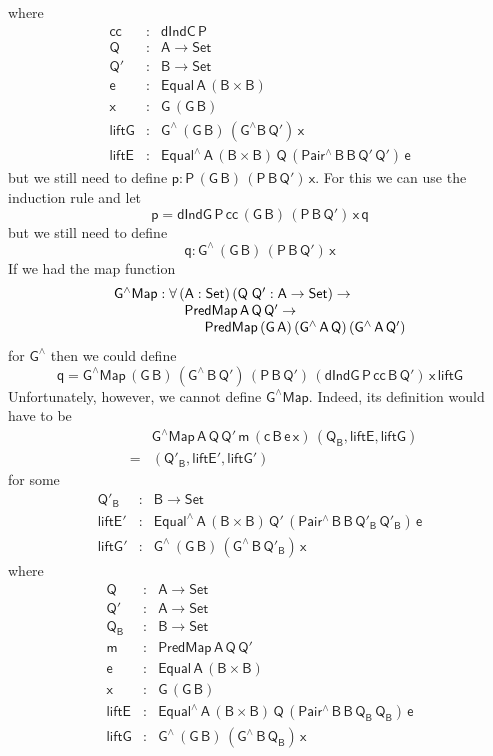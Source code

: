 \documentclass[sigplan,10pt]{acmart}
\begin{document}
where
\[\begin{array}{lll}
\mathsf{cc} & : & \mathsf{dIndC\,P}\\
\mathsf{Q} & : & \mathsf{A \to Set}\\
\mathsf{Q'} & : & \mathsf{B \to Set}\\
\mathsf{e} & : & \mathsf{Equal\,A\,(B \times B)}\\
\mathsf{x} & : & \mathsf{G\,(G\,B)}\\
\mathsf{liftG} & : & \mathsf{G^{\wedge}\,(G\,B)\, (G^{\wedge}
  B\,Q')\,x}\\
\mathsf{liftE} & : & \mathsf{Equal^{\wedge}\,A\,(B \times 
  B)\,Q\,(Pair^{\wedge}\,B\,B\,Q'\,Q')\,e}
\end{array}\]
but we still need to
define $\mathsf{p : P\,(G\,B)\,(P\,B\,Q')\,x}$.  For this we can use
the induction rule and let
\[\mathsf{p = dIndG\,P\,cc\,(G\,B)\,(P\,B\,Q')\,x\,q}\] but we still
need to define \[\mathsf{q : G^{\wedge}\,(G\,B)\,(P\,B\,Q')\,x}\]  If
we had the map function
\[\begin{array}{l}
\mathsf{G^\wedge Map : \forall\, (A : Set)\,
  (Q\;Q' : A \to Set) \to}\\
\hspace*{0.7in}\mathsf{PredMap\,A\,Q\,Q' \to}\\
\hspace*{0.9in}\mathsf{PredMap\,(G\,A)\,(G^{\wedge}\,A\,Q)\,(G^{\wedge}\,A\,Q')} 
\end{array}\]
for $\mathsf{G^{\wedge}}$
then we could define
\[\mathsf{q = G^\wedge Map\,(G\,B)\,(G^{\wedge}\,B\,Q')\,(P\,B\,Q')\,
(dIndG\,P\,cc\,B\,Q')\,x\,liftG}\]  Unfortunately, however,
we cannot define $\mathsf{G^\wedge Map}$. Indeed, its definition would
have to be
\[\begin{array}{ll}
 & \!\!\mathsf{G^\wedge Map\,A\,Q\,Q'\,m\,(c\,B\,e\,x)\,(Q_B,
  liftE, liftG)}\\
\quad\quad= & \!\! \mathsf{(Q'_B, liftE', liftG')}
\end{array}\] for some
\[\begin{array}{lll}
\mathsf{Q'_B} & : & \mathsf{B \to Set}\\
\mathsf{liftE'} & :  & \mathsf{Equal^{\wedge}\,A\,(B \times
  B)\,Q'\,(Pair^{\wedge}\,B\,B\,Q'_B\,Q'_B)\,e}\\
\mathsf{liftG'} & : &
\mathsf{G^{\wedge}\,(G\,B)\,(G^{\wedge}\,B\,Q'_B)\,x}
\end{array}\]
where
\[\begin{array}{lll}
\mathsf{Q} & : & \mathsf{A \to Set}\\
\mathsf{Q'} & : & \mathsf{A \to Set}\\
\mathsf{Q_B} & : & \mathsf{B \to Set}\\
\mathsf{m} & : & \mathsf{PredMap\,A\,Q\,Q'}\\
\mathsf{e} & : & \mathsf{Equal\,A\,(B \times B)}\\
\mathsf{x} & : & \mathsf{G\,(G\,B)}\\
\mathsf{liftE} & : & \mathsf{Equal^{\wedge}\,A\,(B \times
  B)\,Q\,(Pair^{\wedge}\,B\,B\,Q_B\,Q_B)\,e}\\
\mathsf{liftG} & : &
\mathsf{G^{\wedge}\,(G\,B)\,(G^{\wedge}\,B\,Q_B)\,x}
\end{array}\]
\end{document}
